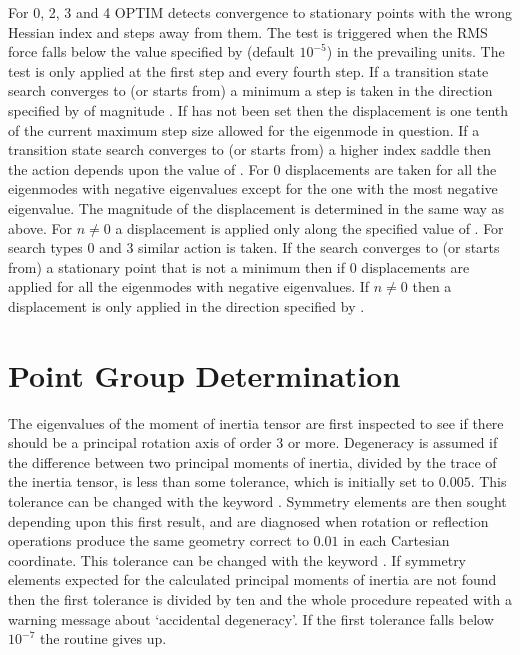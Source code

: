 {{{For  0, 2, 3 and 4 OPTIM detects convergence to stationary points with the
wrong Hessian index and steps away from them. The test is triggered when the RMS force
falls below the value specified by {} (default $10^{-5}$)
in the prevailing units. The test is only applied at the first step and every fourth step. 
If a transition state search converges to (or starts from) a minimum
a step is taken in the direction specified by {} of magnitude {}.
If {} has not been set then the displacement is one tenth of the
current maximum step size allowed for the eigenmode in question.
If a transition state
search converges to (or starts from) a higher index saddle then the action depends upon the
value of {}. For {} 0 displacements are taken for all the eigenmodes
with negative eigenvalues except for the one with the most negative eigenvalue. The magnitude
of the displacement is determined in the same way as above.
For {} $n\not=0$ a displacement is applied only along the specified value of {}.
For search types 0 and 3 similar action is taken. If the search converges to (or starts from)
a stationary point that is not a minimum then if {} 0 displacements are applied
for all the eigenmodes with negative eigenvalues. If {} $n\not=0$ then a displacement
is only applied in the direction specified by {}.

\section{Point Group Determination}
\label{sec:symmetry}
The eigenvalues
of the moment of inertia tensor are first inspected to see if there should be a principal
rotation axis of order 3 or more. Degeneracy is assumed if the difference between two principal
moments of inertia, divided by the trace of the inertia tensor, is less than some tolerance,
which is initially set to $0.005$. This tolerance can be changed with the keyword {}.
Symmetry elements are then sought depending upon this first
result, and are diagnosed when rotation or reflection operations produce the same geometry
correct to $0.01$ in each Cartesian coordinate. This tolerance can be changed with the
keyword {}. If symmetry elements expected for the
calculated principal moments of inertia are not found then the first tolerance is divided by
ten and the whole procedure repeated with a warning message about `accidental degeneracy'. 
If the first tolerance falls below $10^{-7}$ the routine gives up.

}}}
